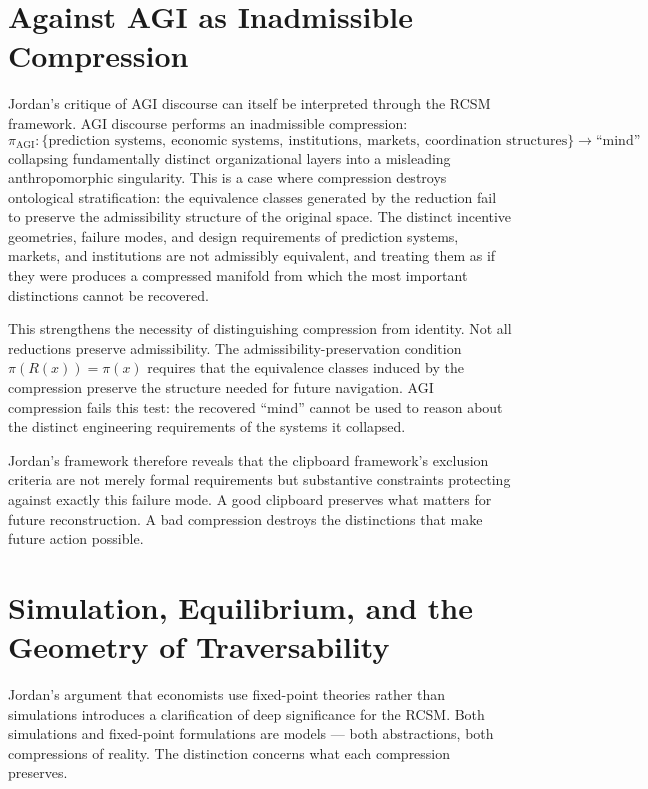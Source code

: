 \documentclass[12pt,oneside]{book}
\theoremstyle{plain}
\theoremstyle{definition}
\theoremstyle{plain}
\begin{document}
\section{Against AGI as Inadmissible Compression}

Jordan's critique of AGI discourse can itself be interpreted through the RCSM framework. AGI discourse performs an inadmissible compression:
\[
\pi_{\text{AGI}} : \{\text{prediction systems},\ \text{economic systems},\ \text{institutions},\ \text{markets},\ \text{coordination structures}\} \to \text{``mind''}
\]
collapsing fundamentally distinct organizational layers into a misleading anthropomorphic singularity. This is a case where compression destroys ontological stratification: the equivalence classes generated by the reduction fail to preserve the admissibility structure of the original space. The distinct incentive geometries, failure modes, and design requirements of prediction systems, markets, and institutions are not admissibly equivalent, and treating them as if they were produces a compressed manifold from which the most important distinctions cannot be recovered.

This strengthens the necessity of distinguishing compression from identity. Not all reductions preserve admissibility. The admissibility-preservation condition $\pi(R(x)) = \pi(x)$ requires that the equivalence classes induced by the compression preserve the structure needed for future navigation. AGI compression fails this test: the recovered ``mind'' cannot be used to reason about the distinct engineering requirements of the systems it collapsed.

Jordan's framework therefore reveals that the clipboard framework's exclusion criteria are not merely formal requirements but substantive constraints protecting against exactly this failure mode. A good clipboard preserves what matters for future reconstruction. A bad compression destroys the distinctions that make future action possible.

\section{Simulation, Equilibrium, and the Geometry of Traversability}

Jordan's argument that economists use fixed-point theories rather than simulations introduces a clarification of deep significance for the RCSM. Both simulations and fixed-point formulations are models --- both abstractions, both compressions of reality. The distinction concerns what each compression preserves.
\end{document}
